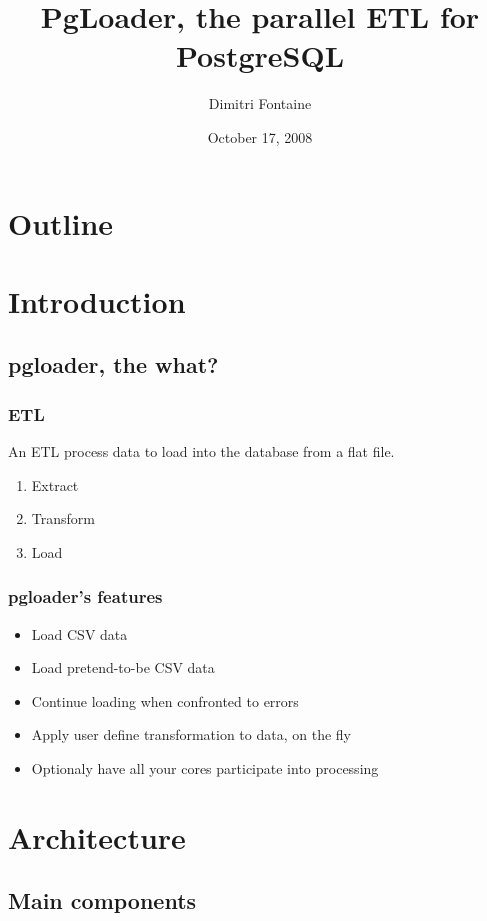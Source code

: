 \documentclass{beamer}
\title{PgLoader, the parallel ETL for PostgreSQL}
\author{Dimitri Fontaine}
\date{October 17, 2008}
\begin{document}
\frame{\titlepage}

\section*{Outline}

\section{Introduction}
\subsection{pgloader, the what?}

\frame
{
  \frametitle{ETL}

  \begin{definition}
    An \alert{ETL} process data to load into the database from a flat
    file.
  \end{definition}

  \begin{enumerate}
   \item Extract
   \item Transform
   \item Load
  \end{enumerate}
}

\frame
{
  \frametitle{pgloader's features}

  \begin{itemize}
   \item<1-> Load CSV data
   \item<2-> Load pretend-to-be CSV data
   \item<3-> Continue loading when confronted to errors
   \item<4-> Apply user define transformation to data, on the fly
   \item<5-> Optionaly have all your cores participate into processing
  \end{itemize}
}

\section{Architecture}
\subsection{Main components}

\end{document}
